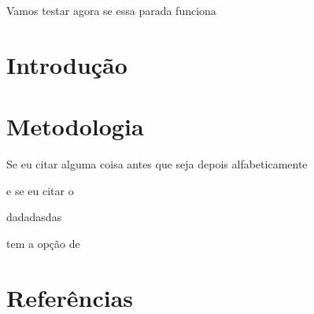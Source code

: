 \documentclass[10pt,a4paper]{article}
\begin{document}
	
	Vamos testar agora se essa parada funciona
	
	\section{Introdução}
	
		
		
	\section{Metodologia}
	Se eu citar alguma coisa antes que seja depois alfabeticamente \cite{Ghangrekar2005}
	
	e se eu citar o \cite{Ferreira2013}
	
	dadadasdas
	
	tem a opção de  \textcite{Morais2016}
	
	\cites{Morais2016a}{Yu2001}
	

	
	\section{Referências}
	
	\printbibliography
	
\end{document}
